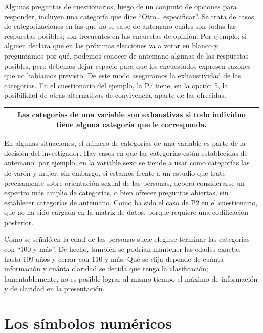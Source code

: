 \documentclass[]{book}
\begin{document}
Algunas preguntas de cuestionarios, luego de un conjunto de opciones para responder, incluyen una categoría que dice ``Otro\ldots{} especificar''. Se trata de casos de categorizaciones en las que no se sabe de antemano cuáles son todas las respuestas posibles; son frecuentes en las encuestas de opinión. Por ejemplo, si alguien declara que en las próximas elecciones va a votar en blanco y preguntamos por qué, podemos conocer de antemano algunas de las respuestas posibles, pero debemos dejar espacio para que los encuestados expresen razones que no habíamos previsto. De este modo aseguramos la exhaustividad de las categorías. En el cuestionario del ejemplo, la P7 tiene, en la opción 5, la posibilidad de otras alternativas de convivencia, aparte de las ofrecidas.

\begin{longtable}[]{@{}c@{}}
\toprule
\endhead
\begin{minipage}[t]{0.97\columnwidth}\centering
Las categorías de una variable son \textbf{exhaustivas} si todo individuo tiene alguna categoría que le corresponda.\strut
\end{minipage}\tabularnewline
\bottomrule
\end{longtable}

En algunas situaciones, el número de categorías de una variable es parte de la decisión del investigador. Hay casos en que las categorías están establecidas de antemano: por ejemplo, en la variable sexo se tiende a usar como categorías las de varón y mujer; sin embargo, si estamos frente a un estudio que trate precisamente sobre orientación sexual de las personas, deberá considerarse un espectro más amplio de categorías, o bien ofrecer preguntas abiertas, sin establecer categorías de antemano. Como ha sido el caso de P2 en el cuestionario, que no ha sido cargada en la matriz de datos, porque requiere una codificación posterior.

Como se señaló,en la edad de las personas suele elegirse terminar las categorías con ``100 y más''. De hecho, también se podrían mantener las edades exactas hasta 109 años y cerrar con 110 y más. Qué se elija depende de cuánta información y cuánta claridad se decida que tenga la clasificación; lamentablemente, no es posible lograr al mismo tiempo el máximo de información y de claridad en la presentación.

\hypertarget{los-simbolos-numericos}{%
\section{Los símbolos numéricos}\label{los-simbolos-numericos}}
\end{document}
